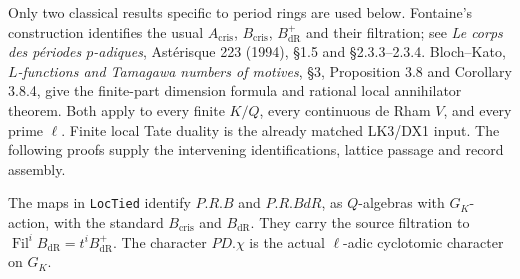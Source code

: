 Only two classical results specific to period rings are used below.
Fontaine's construction identifies the usual
$A_{\mathrm{cris}}$, $B_{\mathrm{cris}}$, $B_{\mathrm{dR}}^+$
and their filtration; see \emph{Le corps des p\'eriodes
$p$-adiques}, Ast\'erisque 223 (1994), \S1.5 and
\S2.3.3--2.3.4.
Bloch--Kato, \emph{$L$-functions and Tamagawa numbers of motives},
\S3, Proposition 3.8 and Corollary 3.8.4, give the finite-part
dimension formula and rational local annihilator theorem.
Both apply to every finite $K/Q$, every continuous de Rham $V$,
and every prime $\ell$.  Finite local Tate duality is the already
matched LK3/DX1 input.  The following proofs supply the intervening
identifications, lattice passage and record assembly.

\begin{proposition}
\label{claim:BX1}
The maps in \texttt{Loc\allowbreak Tied} identify $P.R.B$ and $P.R.BdR$,
as $Q$-algebras with $G_K$-action, with the standard
$B_{\mathrm{cris}}$ and $B_{\mathrm{dR}}$.
They carry the source filtration to
$\operatorname{Fil}^iB_{\mathrm{dR}}=t^iB_{\mathrm{dR}}^+$.
The character $PD.\chi$ is the actual $\ell$-adic cyclotomic
character on $G_K$.
\end{proposition}
